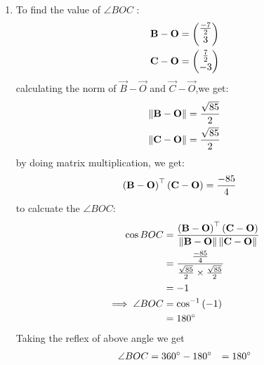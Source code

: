 \documentclass[11pt]{book}
\begin{document}
\begin{enumerate}[label=\thesection.\arabic*.,ref=\thesection.\theenumi]
\begin{enumerate}
\item To find  the value of $\angle{BOC}$ :
\begin{align}
\mathbf{B}-\mathbf{O}
          &= \begin{pmatrix}\frac{-7}{2} \\ 3\end{pmatrix}\\
\mathbf{C}-\mathbf{O}
          &= \begin{pmatrix}\frac{7}{2} \\ -3\end{pmatrix}
\end{align}
calculating the norm of $\vec{B}-\vec{O}$ and $\vec{C}-\vec{O}$,we get:
\begin{align}
	\left\lVert\mathbf{B}-\mathbf{O}\right\rVert &= \frac{\sqrt{85}}{2}\\
	\left\lVert\mathbf{C}-\mathbf{O}\right\rVert &= \frac{\sqrt{85}}{2}
\end{align}
by doing matrix multiplication, we get:
\begin{align}
\left(\mathbf{B}-\mathbf{O}\right)^{\top}\left(\mathbf{C}-\mathbf{O}\right) &= \frac{{-85}}{4}
\end{align}
to calcuate the $\angle{BOC}$:
\begin{align}
\cos{BOC} &= \frac{\left(\mathbf{B}-\mathbf{O}\right)^{\top}\left(\mathbf{C}-\mathbf{O}\right)}{\left\lVert\mathbf{B}-\mathbf{O}\right\rVert\left\lVert\mathbf{C}-\mathbf{O}\right\rVert}\\
&= \frac{\frac{{-85}}{4}}{\frac{\sqrt{85}}{2}\times\frac{\sqrt{85}}{2}}\\
&= -1\\
\implies\angle{BOC}&=\cos^{-1}\left(-1\right)\\
	&= 180\degree
\end{align}
Taking the reflex of above angle we get
		\begin{align}
			\angle{BOC} &= 360\degree - 180\degree
			&= 180\degree\label{eq:1}
		\end{align}


\end{enumerate}
\end{enumerate}
\end{document}
